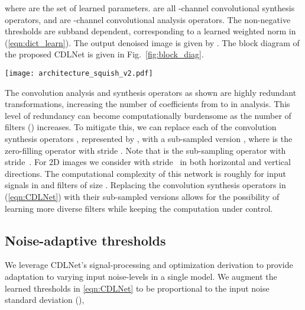\documentclass[conference]{IEEEtran}
\begin{document}
where  are the set of learned parameters.  are all -channel convolutional synthesis operators, and  are -channel convolutional analysis operators. The non-negative thresholds  are  subband dependent, corresponding to a learned weighted  norm in (\ref{eqn:dict_learn}). The output denoised image is given by . The block diagram of the proposed CDLNet is given in Fig.~\ref{fig:block_diag}.

\begin{figure*}[t]
    \centering
    \texttt{[image: architecture\_squish\_v2.pdf]}
    \caption{Block diagram of CDLNet. Analysis and synthesis convolutions map from  to  and  to  channels, respectively. We say that CDLNet does not process signals in a ``learned feature domain" to differentiate from the usage of multi-channel filtering ( to  channels) in DNNs such as DnCNN \cite{DnCNN}. Also note that CDLNet does not use batch-normalization or residual learning, in contrast to DnCNN \cite{DnCNN}.}
    \label{fig:block_diag}
\end{figure*}

The convolution analysis and synthesis operators as shown are highly redundant transformations, increasing the number of coefficients from  to  in analysis. This level of redundancy can become computationally burdensome as the number of filters () increases. To mitigate this, we can replace each of the convolution synthesis operators , represented by , with a sub-sampled version , where  is the zero-filling operator with stride . Note that  is the sub-sampling operator with stride~. For 2D images we consider  with stride~ in both horizontal and vertical directions. The computational complexity of this network is roughly  for input signals in  and filters of size . Replacing the convolution synthesis operators   in (\ref{eqn:CDLNet}) with their sub-sampled versions allows for the possibility of learning more diverse filters while keeping the computation under control. 

\subsection{Noise-adaptive thresholds} \label{sec:prop_ada}
We leverage CDLNet's signal-processing and optimization derivation to provide adaptation to varying input noise-levels in a single model. We augment the learned thresholds in \eqref{eqn:CDLNet} to be proportional to the input noise standard deviation (), 
\end{document}
